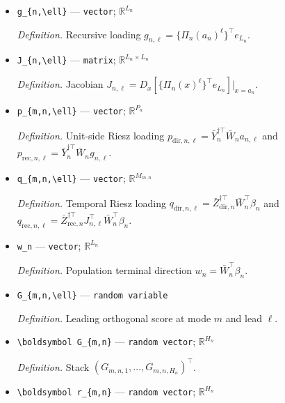 \documentclass{article}
\begin{document}
\begin{itemize}
  \item \texttt{g\_\allowbreak{}\{n,\allowbreak{}\textbackslash{}\allowbreak{}ell\}\allowbreak{}} --- \texttt{vector}; \(\mathbb R^{L_n}\)
  \par\smallskip\noindent\emph{Definition.} Recursive loading \(g_{n,\ell}=\{\Pi_n(a_n)^\ell\}^{\top}e_{L_n}\).
  \item \texttt{J\_\allowbreak{}\{n,\allowbreak{}\textbackslash{}\allowbreak{}ell\}\allowbreak{}} --- \texttt{matrix}; \(\mathbb R^{L_n\times L_n}\)
  \par\smallskip\noindent\emph{Definition.} Jacobian \(J_{n,\ell}=D_x[\{\Pi_n(x)^\ell\}^{\top}e_{L_n}]|_{x=a_n}\).
  \item \texttt{p\_\allowbreak{}\{m,\allowbreak{}n,\allowbreak{}\textbackslash{}\allowbreak{}ell\}\allowbreak{}} --- \texttt{vector}; \(\mathbb R^{P_n}\)
  \par\smallskip\noindent\emph{Definition.} Unit-side Riesz loading \(p_{\mathrm{dir},n,\ell}=\bar Y_n^{\dagger\top}\bar W_n a_{n,\ell}\) and \(p_{\mathrm{rec},n,\ell}=\bar Y_n^{\dagger\top}\bar W_n g_{n,\ell}\).
  \item \texttt{q\_\allowbreak{}\{m,\allowbreak{}n,\allowbreak{}\textbackslash{}\allowbreak{}ell\}\allowbreak{}} --- \texttt{vector}; \(\mathbb R^{M_{m,n}}\)
  \par\smallskip\noindent\emph{Definition.} Temporal Riesz loading \(q_{\mathrm{dir},n,\ell}=\bar Z_{\mathrm{dir},n}^{\dagger\top}\bar W_n^{\top}\beta_n\) and \(q_{\mathrm{rec},n,\ell}=\bar Z_{\mathrm{rec},n}^{\dagger\top}J_{n,\ell}^{\top}\bar W_n^{\top}\beta_n\).
  \item \texttt{w\_\allowbreak{}n} --- \texttt{vector}; \(\mathbb R^{L_n}\)
  \par\smallskip\noindent\emph{Definition.} Population terminal direction \(w_n=\bar W_n^{\top}\beta_n\).
  \item \texttt{G\_\allowbreak{}\{m,\allowbreak{}n,\allowbreak{}\textbackslash{}\allowbreak{}ell\}\allowbreak{}} --- \texttt{random variable}
  \par\smallskip\noindent\emph{Definition.} Leading orthogonal score at mode \(m\) and lead \(\ell\).
  \item \texttt{\textbackslash{}\allowbreak{}boldsymbol G\_\allowbreak{}\{m,\allowbreak{}n\}\allowbreak{}} --- \texttt{random vector}; \(\mathbb R^{H_n}\)
  \par\smallskip\noindent\emph{Definition.} Stack \((G_{m,n,1},\ldots,G_{m,n,H_n})^{\top}\).
  \item \texttt{\textbackslash{}\allowbreak{}boldsymbol r\_\allowbreak{}\{m,\allowbreak{}n\}\allowbreak{}} --- \texttt{random vector}; \(\mathbb R^{H_n}\)

\end{itemize}
\end{document}
